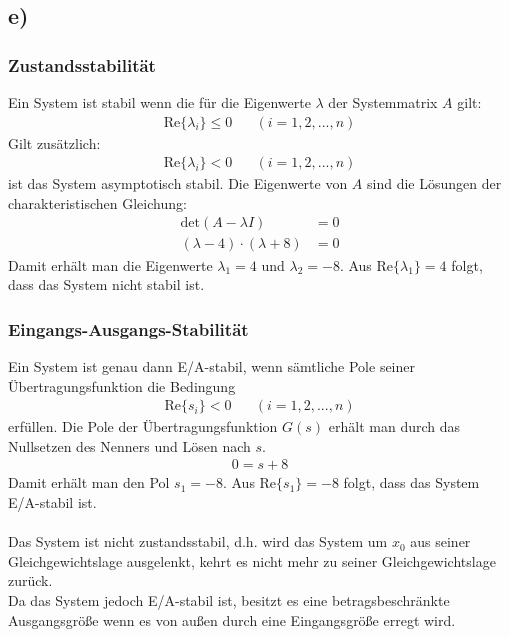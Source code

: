 \documentclass[11pt]{scrartcl} %
\begin{document}
\subsection*{e)}
\subsubsection*{Zustandsstabilität}
Ein System ist stabil wenn die für die Eigenwerte $\lambda$ der Systemmatrix $A$ gilt:
\begin{align*}
	\text{Re}\{\lambda_i\}\leq0\hspace{20pt}(i=1,2,...,n)
\end{align*}
Gilt zusätzlich:
\begin{align*}
	\text{Re}\{\lambda_i\}<0\hspace{20pt}(i=1,2,...,n)
\end{align*}
ist das System asymptotisch stabil.
Die Eigenwerte von $A$ sind die Lösungen der charakteristischen Gleichung:
\begin{align*}
	\text{det}(A-\lambda I)&=0\\
	(\lambda-4)\cdot(\lambda+8)&=0
\end{align*}
Damit erhält man die Eigenwerte $\lambda_1=4$ und $\lambda_2=-8$. Aus $\text{Re}\{\lambda_{1}\}=4$ folgt, dass das System nicht stabil ist.
\subsubsection*{Eingangs-Ausgangs-Stabilität}
Ein System ist genau dann E/A-stabil, wenn sämtliche Pole seiner Übertragungsfunktion die Bedingung 
\begin{align*}
	\text{Re}\{s_i\}<0\hspace{20pt}(i=1,2,...,n)
\end{align*}
erfüllen.
Die Pole der Übertragungsfunktion $G(s)$ erhält man durch das Nullsetzen des Nenners und Lösen nach $s$.
\begin{align*}
	0=s+8
\end{align*}
Damit erhält man den Pol $s_1=-8$. Aus $\text{Re}\{s_{1}\}=-8$
folgt, dass das System E/A-stabil ist.\\\\
Das System ist nicht zustandsstabil, d.h. wird das System um $x_0$ aus seiner Gleichgewichtslage ausgelenkt, kehrt es nicht mehr zu seiner Gleichgewichtslage zurück.\\
Da das System jedoch E/A-stabil ist, besitzt es eine betragsbeschränkte Ausgangsgröße wenn es von außen durch eine Eingangsgröße erregt wird.
\end{document}

